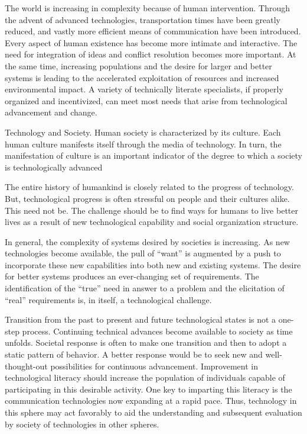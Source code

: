 The world is increasing in complexity because of human intervention. Through the advent of advanced technologies, transportation times have been greatly reduced, and vastly more efficient means of communication have been introduced. Every aspect of human existence has become more intimate and interactive. The need for integration of ideas and conflict resolution becomes more important. At the same time, increasing populations and the desire for larger and better systems is leading to the accelerated exploitation of resources and increased environmental impact. A variety of technically literate specialists, if properly organized and incentivized, can meet most needs that arise from technological advancement and change.

Technology and Society. Human society is characterized by its culture. Each human culture manifests itself through the media of technology. In turn, the manifestation of culture is an important indicator of the degree to which a society is technologically advanced

The entire history of humankind is closely related to the progress of technology. But, technological progress is often stressful on people and their cultures alike. This need not be. The challenge should be to find ways for humans to live better lives as a result of new technological capability and social organization structure.

In general, the complexity of systems desired by societies is increasing. As new technologies become available, the pull of ``want'' is augmented by a push to incorporate these new capabilities into both new and existing systems. The desire for better systems produces an ever-changing set of requirements. The identification of the ``true'' need in answer to a problem and the elicitation of ``real'' requirements is, in itself, a technological challenge.

Transition from the past to present and future technological states is not a one-step process. Continuing technical advances become available to society as time unfolds. Societal response is often to make one transition and then to adopt a static pattern of behavior. A better response would be to seek new and well-thought-out possibilities for continuous advancement. Improvement in technological literacy should increase the population of individuals capable of participating in this desirable activity. One key to imparting this literacy is the communication technologies now expanding at a rapid pace. Thus, technology in this sphere may act favorably to aid the understanding and subsequent evaluation by society of technologies in other spheres.